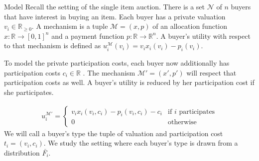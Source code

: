 \documentclass[11pt,a4paper]{article}
\newcommand{\RR}{\ensuremath{\mathbb{R}}}
\newcommand{\1}[1]{\mbox{\rm\bf 1}_{#1}}
\begin{document}
\begin{section}{Model}
 \label{sec:model}
 Recall the setting of the single item auction.
 There is a set $\mathcal{N}$ of $n$ buyers that have interest in buying an item.
 Each buyer has a private valuation $v_i \in \RR_{\geq 0}$.
 A mechanism is a tuple $\mathcal{M} = (x,p)$ of an allocation function $x: \RR \rightarrow [0,1]^n$ and a payment function $p: \RR \rightarrow \RR^n$.
 A buyer's utility with respect to that mechanism is defined as $u_i^\mathcal{M}(v_i) = v_i x_i(v_i) - p_i(v_i)$.

 To model the private participation costs, each buyer now additionally has participation costs $c_i \in \RR$ \cite{primary}.
 The mechanism $\mathcal{M}' = (x', p')$ will respect that participation costs as well.
 A buyer's utility is reduced by her participation cost if she participates.

 \begin{align*}
     u_i^{\mathcal{M}'} = \begin{cases}
                              v_i x_i(v_i, c_i) - p_i(v_i, c_i) - c_i & \text{if $i$ participates} \\
                              0                                       & \text{otherwise}
                          \end{cases}
 \end{align*}
 We will call a buyer's type the tuple of valuation and participation cost $t_i = (v_i, c_i)$.
 We study the setting where each buyer's type is drawn from a distribution $\bar{F_i}$.
\end{section}
\end{document}

